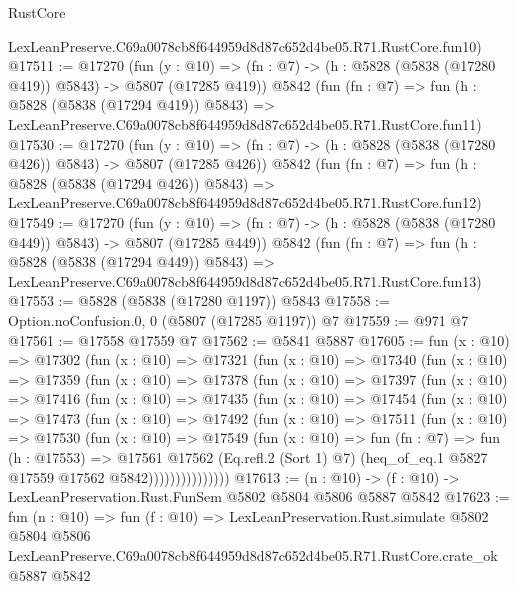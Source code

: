 \begin{lexlean}{RustCore}
\begin{coremodule}
    LexLeanPreserve.C69a0078cb8f644959d8d87c652d4be05.R71.RustCore.fun10)
@17511 := @17270
    (fun (y : @10) => (fn : @7) -> (h : @5828 (@5838 (@17280 @419)) @5843) -> @5807 (@17285 @419))
    @5842
    (fun (fn : @7) =>
    fun (h : @5828 (@5838 (@17294 @419)) @5843) =>
    LexLeanPreserve.C69a0078cb8f644959d8d87c652d4be05.R71.RustCore.fun11)
@17530 := @17270
    (fun (y : @10) => (fn : @7) -> (h : @5828 (@5838 (@17280 @426)) @5843) -> @5807 (@17285 @426))
    @5842
    (fun (fn : @7) =>
    fun (h : @5828 (@5838 (@17294 @426)) @5843) =>
    LexLeanPreserve.C69a0078cb8f644959d8d87c652d4be05.R71.RustCore.fun12)
@17549 := @17270
    (fun (y : @10) => (fn : @7) -> (h : @5828 (@5838 (@17280 @449)) @5843) -> @5807 (@17285 @449))
    @5842
    (fun (fn : @7) =>
    fun (h : @5828 (@5838 (@17294 @449)) @5843) =>
    LexLeanPreserve.C69a0078cb8f644959d8d87c652d4be05.R71.RustCore.fun13)
@17553 := @5828 (@5838 (@17280 @1197)) @5843
@17558 := Option.noConfusion.{0, 0} (@5807 (@17285 @1197)) @7
@17559 := @971 @7
@17561 := @17558 @17559 @7
@17562 := @5841 @5887
@17605 := fun (x : @10) =>
  @17302
    (fun (x : @10) =>
    @17321
      (fun (x : @10) =>
      @17340
        (fun (x : @10) =>
        @17359
          (fun (x : @10) =>
          @17378
            (fun (x : @10) =>
            @17397
              (fun (x : @10) =>
              @17416
                (fun (x : @10) =>
                @17435
                  (fun (x : @10) =>
                  @17454
                    (fun (x : @10) =>
                    @17473
                      (fun (x : @10) =>
                      @17492
                        (fun (x : @10) =>
                        @17511
                          (fun (x : @10) =>
                          @17530
                            (fun (x : @10) =>
                            @17549
                              (fun (x : @10) =>
                              fun (fn : @7) =>
                              fun (h : @17553) =>
                              @17561
                                @17562
                                (Eq.refl.{2} (Sort 1) @7)
                                (heq_of_eq.{1} @5827 @17559 @17562 @5842)))))))))))))))
@17613 := (n : @10) -> (f : @10) -> LexLeanPreservation.Rust.FunSem @5802 @5804 @5806 @5887 @5842
@17623 := fun (n : @10) =>
  fun (f : @10) =>
  LexLeanPreservation.Rust.simulate
    @5802
    @5804
    @5806
    LexLeanPreserve.C69a0078cb8f644959d8d87c652d4be05.R71.RustCore.crate_ok
    @5887
    @5842
\end{coremodule}
\end{lexlean}
